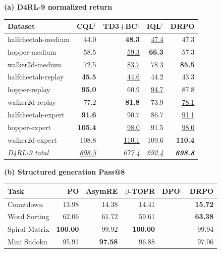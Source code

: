 \documentclass{article}
\theoremstyle{plain}
\theoremstyle{definition}
\theoremstyle{remark}
\begin{document}
\begin{table}[t]
\begin{minipage}[t]{0.465\textwidth}
\centering
\textbf{(a) D4RL-9 normalized return}\par\vspace{2pt}
{\scriptsize
\setlength{\tabcolsep}{2.05pt}
\renewcommand{\arraystretch}{1.04}
\begin{tabular}{@{}lrrrr@{}}
\toprule
Dataset & CQL$^\dagger$ & TD3+BC$^\dagger$ & IQL$^\dagger$ & \textbf{DRPO} \\
\midrule
halfcheetah-medium & 44.0 & \textbf{48.3} & \underline{47.4} & 47.3 \\
hopper-medium & 58.5 & \underline{59.3} & \textbf{66.3} & 57.3 \\
walker2d-medium & 72.5 & \underline{83.7} & 78.3 & \textbf{85.5} \\
halfcheetah-replay & \textbf{45.5} & \underline{44.6} & 44.2 & 43.3 \\
hopper-replay & \textbf{95.0} & 60.9 & \underline{94.7} & 87.8 \\
walker2d-replay & 77.2 & \textbf{81.8} & 73.9 & \underline{78.1} \\
halfcheetah-expert & \textbf{91.6} & 90.7 & 86.7 & \underline{91.1} \\
hopper-expert & \textbf{105.4} & \underline{98.0} & 91.5 & \underline{98.0} \\
walker2d-expert & 108.8 & \underline{110.1} & 109.6 & \textbf{110.4} \\
\midrule
\textit{D4RL-9 total} & \textit{\underline{698.5}} & \textit{677.4} &
\textit{692.4} & \textbf{\textit{698.8}} \\
\bottomrule
\end{tabular}
}
\end{minipage}
\hfill
\begin{minipage}[t]{0.515\textwidth}
\centering
\textbf{(b) Structured generation Pass@8}\par\vspace{2pt}
{\scriptsize
\setlength{\tabcolsep}{2.1pt}
\renewcommand{\arraystretch}{1.04}
\begin{tabular}{@{}lrrrrr@{}}
\toprule
Task & PO & AsymRE & $\beta$-TOPR & DPO$^\ddagger$ & \textbf{DRPO} \\
\midrule
Countdown & 13.98 & 14.38 & 14.41 & & \textbf{15.72} \\
Word Sorting & 62.06 & 61.72 & 59.61 & & \textbf{63.38} \\
Spiral Matrix & \textbf{100.00} & 99.92 & \textbf{100.00} & & 99.94 \\
Mini Sudoku & 95.91 & \textbf{97.58} & 96.88 & & 97.06 \\

\end{tabular}}
\end{minipage}
\end{table}
\end{document}
